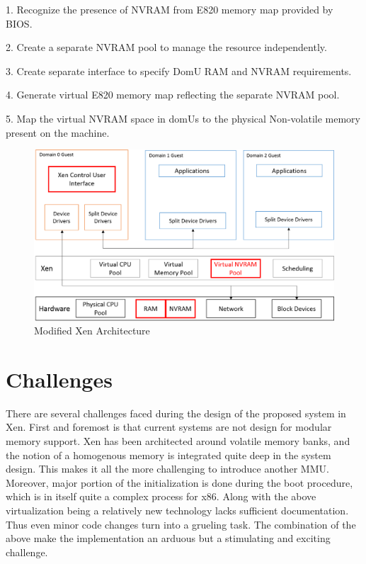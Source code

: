 1. Recognize the presence of NVRAM from E820 memory map provided by BIOS.

2. Create a separate NVRAM pool to manage the resource independently.

3. Create separate interface to specify DomU RAM and NVRAM requirements.

4. Generate virtual E820 memory map reflecting the separate NVRAM pool.

5. Map the virtual NVRAM space in domUs to the physical Non-volatile memory present on the machine. 

\begin{figure}[H]
\centering
\includegraphics[scale=0.6]{figures/Xen_mod_model.png}
\caption{Modified Xen Architecture}
\label{fig:xen_mod}
\end{figure}

\section{Challenges}

There are several challenges faced during the design of the proposed system in Xen. First and foremost is that current systems are not design for modular memory support. Xen has been architected around volatile memory banks, and the notion of a homogenous memory is integrated quite deep in the system design. This makes it all the more challenging to introduce another MMU. Moreover, major portion of the initialization is done during the boot procedure, which is in itself quite a complex process for x86. Along with the above virtualization being a relatively new technology lacks sufficient documentation. Thus even minor code changes turn into a grueling task. The combination of the above make the implementation an arduous but a stimulating and exciting challenge. 


